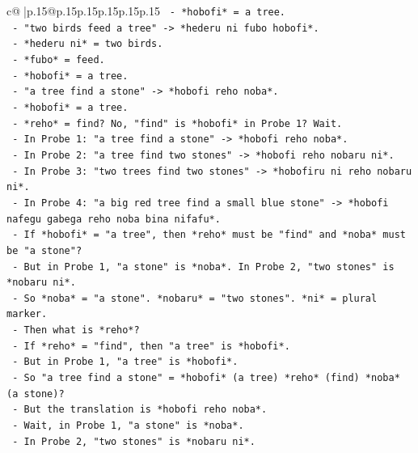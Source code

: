 \documentclass{article}
\begin{document}
{\begin{supertabular}{c@{$\;$}|p{.15\linewidth}@{}p{.15\linewidth}p{.15\linewidth}p{.15\linewidth}p{.15\linewidth}p{.15\linewidth}}
{{{\texttt{              {-} *hobofi* = a tree.} \\
\texttt{            {-} "two birds feed a tree" {-}> *hederu ni fubo hobofi*.} \\
\texttt{              {-} *hederu ni* = two birds.} \\
\texttt{              {-} *fubo* = feed.} \\
\texttt{              {-} *hobofi* = a tree.} \\
\texttt{            {-} "a tree find a stone" {-}> *hobofi reho noba*.} \\
\texttt{              {-} *hobofi* = a tree.} \\
\texttt{              {-} *reho* = find? No, "find" is *hobofi* in Probe 1? Wait.} \\
\texttt{              {-} In Probe 1: "a tree find a stone" {-}> *hobofi reho noba*.} \\
\texttt{              {-} In Probe 2: "a tree find two stones" {-}> *hobofi reho nobaru ni*.} \\
\texttt{              {-} In Probe 3: "two trees find two stones" {-}> *hobofiru ni reho nobaru ni*.} \\
\texttt{              {-} In Probe 4: "a big red tree find a small blue stone" {-}> *hobofi nafegu gabega reho noba bina nifafu*.} \\
\texttt{              {-} If *hobofi* = "a tree", then *reho* must be "find" and *noba* must be "a stone"?} \\
\texttt{              {-} But in Probe 1, "a stone" is *noba*. In Probe 2, "two stones" is *nobaru ni*.} \\
\texttt{              {-} So *noba* = "a stone". *nobaru* = "two stones". *ni* = plural marker.} \\
\texttt{              {-} Then what is *reho*?} \\
\texttt{              {-} If *reho* = "find", then "a tree" is *hobofi*.} \\
\texttt{              {-} But in Probe 1, "a tree" is *hobofi*.} \\
\texttt{              {-} So "a tree find a stone" = *hobofi* (a tree) *reho* (find) *noba* (a stone)?} \\
\texttt{              {-} But the translation is *hobofi reho noba*.} \\
\texttt{              {-} Wait, in Probe 1, "a stone" is *noba*.} \\
\texttt{              {-} In Probe 2, "two stones" is *nobaru ni*.} \\
}}}
\end{supertabular}}
\end{document}
